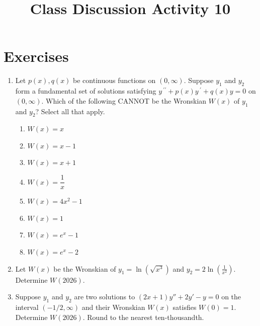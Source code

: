 \documentclass{ximera}
\begin{document}
\begin{abstract}
 \end{abstract}

    \title{Class Discussion Activity 10}
    
    \maketitle

\section*{Exercises}


\begin{enumerate}[label=(\arabic*)]

\item Let $p(x),q(x)$ be continuous functions on $(0,\infty)$.  Suppose $y_1$ and $y_2$ form a fundamental set of solutions satisfying $\displaystyle y\,^{\prime\prime}+p(x)y\,^{\prime}+q(x)y=0$ on $(0,\infty)$.  Which of the following CANNOT be the Wronskian $W(x)$ of $y_1$ and $y_2$?  Select all that apply.


\begin{enumerate}[label=(\alph*)]
\item  $W(x)=x$
\item  $W(x)=x-1$ %
\item  $W(x)=x+1$
\item  $W(x)=\dfrac{1}{x}$ 
\item  $W(x)=4x^2-1$ %
\item  $W(x)=1$
\item  $W(x)=e^x-1$
\item  $W(x)=e^x-2$ %
\end{enumerate}


\item Let $W(x)$ be the Wronskian of $y_1=\ln{\left(\sqrt{x^3}\right)}$ and $\displaystyle y_2=2\ln{\left(\frac{1}{x^2}\right)}$.  Determine $W(2026)$.




\item Suppose $y_1$ and $y_2$ are two solutions to $\displaystyle (2x+1) y''+2 y'-y=0$ on the interval $(-1/2,\infty)$ and their Wronskian $W(x)$ satisfies $W(0)=1$.  Determine $W(2026)$.  Round to the nearest ten-thousandth.



\end{enumerate}
\end{document}
